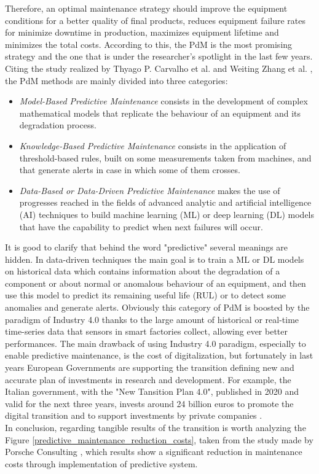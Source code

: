 Therefore, an optimal maintenance strategy should improve the equipment conditions for a better quality of final products, reduces equipment failure rates for minimize downtime in production, maximizes equipment lifetime and minimizes the total costs. According to this, the PdM is the most promising strategy and the one that is under the researcher's spotlight in the last few years. \\ 
Citing the study realized by Thyago P. Carvalho et al. \cite{3SystematicLiteratureReviewML} and Weiting Zhang et al. \cite{2DataDrivenMaintenance}, the PdM methods are mainly divided into three categories: 
\begin{itemize}
\item{\textit{Model-Based Predictive Maintenance} consists in the development of complex mathematical models that replicate the behaviour of an equipment and its degradation process.}
\item{\textit{Knowledge-Based Predictive Maintenance} consists in the application of threshold-based rules, built on some measurements taken from machines, and that generate alerts in case in which some of them crosses.}
\item{\textit{Data-Based or Data-Driven Predictive Maintenance} makes the use of progresses reached in the fields of advanced analytic and artificial intelligence (AI) techniques to build machine learning (ML) or deep learning (DL) models that have the capability to predict when next failures will occur. }
\end{itemize}

It is good to clarify that behind the word "predictive" several meanings are hidden. In data-driven techniques the main goal is to train a ML or DL models on historical data which contains information about the degradation of a component or about normal or anomalous behaviour of an equipment, and then use this model to predict its remaining useful life (RUL) or to detect some anomalies and generate alerts. Obviously this category of PdM is boosted by the paradigm of Industry 4.0 thanks to the large amount of historical or real-time time-series data that sensors in smart factories collect, allowing ever better performances.
The main drawback of using Industry 4.0 paradigm, especially to enable predictive maintenance, is the cost of digitalization, but fortunately in last years European Governments are supporting the transition defining new and accurate plan of investments in research and development. For example, the Italian government, with the "New Tansition Plan 4.0", published in 2020 and valid for the next three years, invests around 24 billion euros to promote the digital transition and to support investments by private companies \cite{12MiseNuovoPianoTransizione}. \\ 
In conclusion, regarding tangible results of the transition is worth analyzing the Figure \ref{predictive_maintenance_reduction_costs}, taken from the study made by Porsche Consulting \cite{11PorscheStudy}, which results show a significant reduction in maintenance costs through implementation of predictive system.

